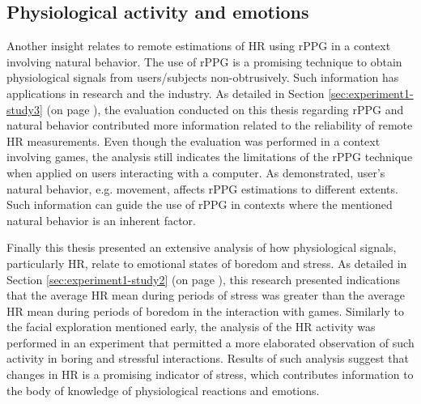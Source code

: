 \subsection{Physiological activity and emotions}

Another insight relates to remote estimations of HR using rPPG in a context involving natural behavior. The use of rPPG is a promising technique to obtain physiological signals from users/subjects non-obtrusively. Such information has applications in research and the industry. As detailed in Section \ref{sec:experiment1-study3} (on page \pageref{sec:experiment1-study3}), the evaluation conducted on this thesis regarding rPPG and natural behavior contributed more information related to the reliability of remote HR measurements. Even though the evaluation was performed in a context involving games, the analysis still indicates the limitations of the rPPG technique when applied on users interacting with a computer. As demonstrated, user's natural behavior, e.g. movement, affects rPPG estimations to different extents. Such information can guide the use of rPPG in contexts where the mentioned natural behavior is an inherent factor.

Finally this thesis presented an extensive analysis of how physiological signals, particularly HR, relate to emotional states of boredom and stress. As detailed in Section \ref{sec:experiment1-study2} (on page \pageref{sec:experiment1-study2}), this research presented indications that the average HR mean during periods of stress was greater than the average HR mean during periods of boredom in the interaction with games. Similarly to the facial exploration mentioned early, the analysis of the HR activity was performed in an experiment that permitted a more elaborated observation of such activity in boring and stressful interactions. Results of such analysis suggest that changes in HR is a promising indicator of stress, which contributes information to the body of knowledge of physiological reactions and emotions.



